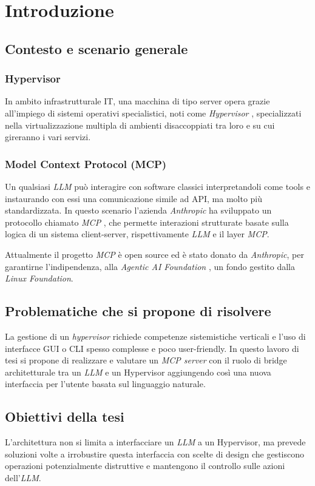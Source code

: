 \chapter{Introduzione}

\section{Contesto e scenario generale}
\subsection{Hypervisor}
In ambito infrastrutturale IT, una macchina di tipo server opera grazie all'impiego di sistemi operativi specialistici, noti come \textit{Hypervisor} \cite{IBM_hypervisor_overview}, specializzati nella virtualizzazione multipla di ambienti disaccoppiati tra loro e su cui gireranno i vari servizi.


\subsection{Model Context Protocol (MCP)}
Un qualsiasi \textit{LLM} può interagire con software classici interpretandoli come tools e instaurando con essi una comunicazione simile ad API, ma molto più standardizzata.
In questo scenario l'azienda \textit{Anthropic} ha sviluppato un protocollo chiamato \textit{MCP} \cite{mcp_anthropic_announcement}, che permette interazioni strutturate basate sulla logica di un sistema client-server, rispettivamente \textit{LLM} e il layer \textit{MCP}.

Attualmente il progetto \textit{MCP} è open source ed è stato donato da \textit{Anthropic}, per garantirne l'indipendenza, alla \textit{Agentic AI Foundation} \cite{mcp_agentic_ai_foundation} \cite{mcp_project_page}, un fondo gestito dalla \textit{Linux Foundation}.

\section{Problematiche che si propone di risolvere}
La gestione di un \textit{hypervisor} richiede competenze sistemistiche verticali e l'uso di interfacce GUI o CLI spesso complesse e poco user-friendly.
In questo lavoro di tesi si propone di realizzare e valutare un \textit{MCP server} con il ruolo di bridge architetturale tra un \textit{LLM} e un Hypervisor aggiungendo così una nuova interfaccia per l'utente basata sul linguaggio naturale.

\section{Obiettivi della tesi}
L'architettura non si limita a interfacciare un \textit{LLM} a un Hypervisor, ma prevede soluzioni volte a irrobustire questa interfaccia con scelte di design che gestiscono operazioni potenzialmente distruttive e mantengono il controllo sulle azioni dell'\textit{LLM}.
